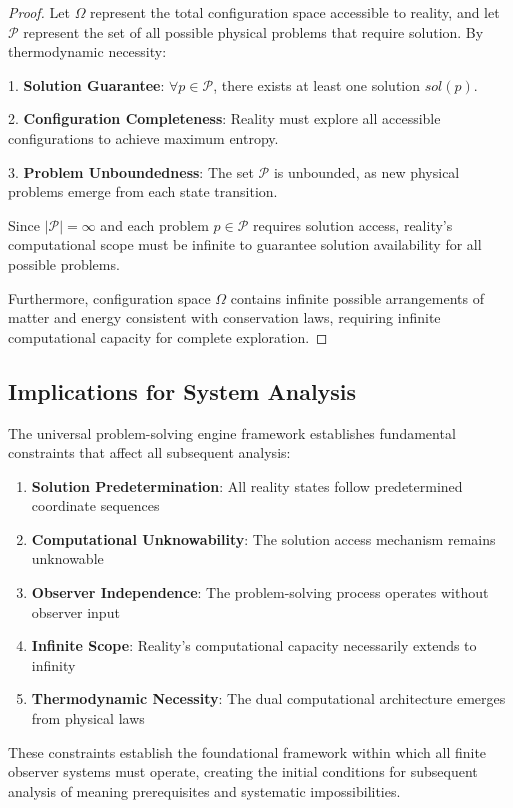 \documentclass[12pt,a4paper]{article}
\begin{document}
\begin{proof}
Let $\Omega$ represent the total configuration space accessible to reality, and let $\mathcal{P}$ represent the set of all possible physical problems that require solution. By thermodynamic necessity:

1. \textbf{Solution Guarantee}: $\forall p \in \mathcal{P}$, there exists at least one solution $sol(p)$.

2. \textbf{Configuration Completeness}: Reality must explore all accessible configurations to achieve maximum entropy.

3. \textbf{Problem Unboundedness}: The set $\mathcal{P}$ is unbounded, as new physical problems emerge from each state transition.

Since $|\mathcal{P}| = \infty$ and each problem $p \in \mathcal{P}$ requires solution access, reality's computational scope must be infinite to guarantee solution availability for all possible problems.

Furthermore, configuration space $\Omega$ contains infinite possible arrangements of matter and energy consistent with conservation laws, requiring infinite computational capacity for complete exploration.
\end{proof}

\subsection{Implications for System Analysis}

The universal problem-solving engine framework establishes fundamental constraints that affect all subsequent analysis:

\begin{enumerate}
\item \textbf{Solution Predetermination}: All reality states follow predetermined coordinate sequences
\item \textbf{Computational Unknowability}: The solution access mechanism remains unknowable
\item \textbf{Observer Independence}: The problem-solving process operates without observer input
\item \textbf{Infinite Scope}: Reality's computational capacity necessarily extends to infinity
\item \textbf{Thermodynamic Necessity}: The dual computational architecture emerges from physical laws
\end{enumerate}

These constraints establish the foundational framework within which all finite observer systems must operate, creating the initial conditions for subsequent analysis of meaning prerequisites and systematic impossibilities.
\end{document}
